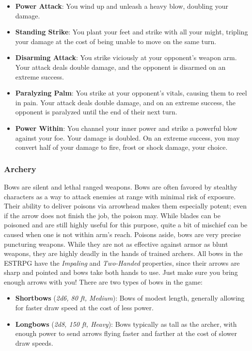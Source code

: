 \begin{itemize}
	\item \textbf{Power Attack}: You wind up and unleash a heavy blow, doubling your damage.
	\item \textbf{Standing Strike}: You plant your feet and strike with all your might, tripling your damage at the cost of being unable to move on the same turn.
	\item \textbf{Disarming Attack}: You strike viciously at your opponent's weapon arm. Your attack deals double damage, and the opponent is disarmed on an extreme success.
	\item \textbf{Paralyzing Palm}: You strike at your opponent's vitals, causing them to reel in pain. Your attack deals double damage, and on an extreme success, the opponent is paralyzed until the end of their next turn.
	\item \textbf{Power Within}: You channel your inner power and strike a powerful blow against your foe. Your damage is doubled. On an extreme success, you may convert half of your damage to fire, frost or shock damage, your choice.
\end{itemize}

\subsubsection{Archery}

Bows are silent and lethal ranged weapons. Bows are often favored by stealthy characters as a way to attack enemies at range with minimal risk of exposure. Their ability to deliver poisons via arrowhead makes them especially potent; even if the arrow does not finish the job, the poison may. While blades can be poisoned and are still highly useful for this purpose, quite a bit of mischief can be caused when one is not within arm's reach. Poisons aside, bows are very precise puncturing weapons. While they are not as effective against armor as blunt weapons, they are highly deadly in the hands of trained archers. All bows in the ESTRPG have the \textit{Impaling} and \textit{Two-Handed} properties, since their arrows are sharp and pointed and bows take both hands to use. Just make sure you bring enough arrows with you! There are two types of bows in the game:

\begin{itemize}
	\item \textbf{Shortbows} (\textit{2d6, 80 ft, Medium}): Bows of modest length, generally allowing for faster draw speed at the cost of less power.
	\item \textbf{Longbows} (\textit{2d8, 150 ft, Heavy}): Bows typically as tall as the archer, with enough power to send arrows flying faster and farther at the cost of slower draw speeds.
\end{itemize}

